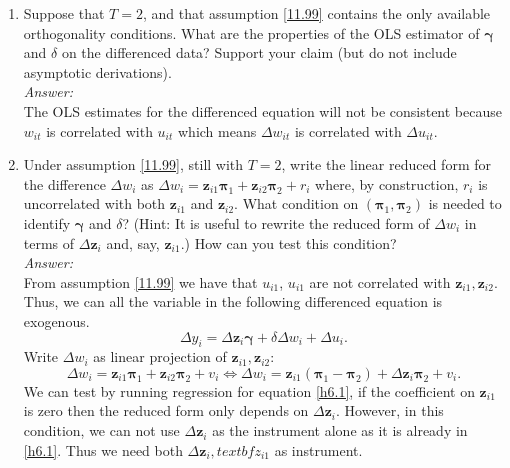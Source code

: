\documentclass[10pt]{article}
\begin{document}
\begin{enumerate}[label=\alph*.]
\item Suppose that $T=2$, and that assumption \eqref{11.99} contains the only available orthogonality conditions. What are the properties of the OLS estimator of $\pmb{\gamma}$ and $\delta$ on the differenced data? Support your claim (but do not include asymptotic derivations).
\\ \textit{Answer:}\\
The OLS estimates for the differenced equation will not be consistent because $w_{it}$ is correlated with $u_{it}$ which means $\Delta w_{it}$ is correlated with $\Delta u_{it}$.

\item Under assumption \eqref{11.99}, still with $T=2$, write the linear reduced form for the difference $\Delta w_i$ as $\Delta w_i=\textbf{z}_{i1}\pmb{\pi}_1+\textbf{z}_{i2}\pmb{\pi}_2+r_i$ where, by construction, $r_i$ is uncorrelated with both $\textbf{z}_{i1}$ and $\textbf{z}_{i2}$. What condition on $(\pmb{\pi}_1,\pmb{\pi}_2)$ is needed to identify $\pmb{\gamma}$ and $\delta$? (Hint: It is useful to rewrite the reduced form of $\Delta w_i$ in terms of $\Delta \textbf{z}_i$ and, say, $\textbf{z}_{i1}$.) How can you test this condition?
\\ \textit{Answer:}\\
From assumption \eqref{11.99} we have that $u_{i1}$, $u_{i1}$ are not correlated with $\textbf{z}_{i1},\textbf{z}_{i2}$. Thus, we can all the variable in the following differenced equation is exogenous.
\[\Delta y_i=\Delta \textbf{z}_i\pmb{\gamma}+\delta \Delta w_i+\Delta u_i.\]
Write $\Delta w_i$ as linear projection of $\textbf{z}_{i1}, \textbf{z}_{i2}$:
\[\Delta w_i=\textbf{z}_{i1}\pmb{\pi}_1+ \textbf{z}_{i2}\pmb{\pi}_2+v_i\Leftrightarrow \Delta w_i=\textbf{z}_{i1}(\pmb{\pi}_1-\pmb{\pi}_2)+ \Delta \textbf{z}_{i}\pmb{\pi}_2+v_i. \tag{1}\label{h6.1}\]
We can test by running regression for equation \eqref{h6.1}, if the coefficient on $\textbf{z}_{i1}$ is zero then the reduced form only depends on $\Delta \textbf{z}_{i}$. However, in this condition, we can not use $\Delta \textbf{z}_{i}$ as the instrument alone as it is already in  \eqref{h6.1}. Thus we need both $\Delta \textbf{z}_{i}, textbf{z}_{i1}$ as instrument.


\end{enumerate}
\end{document}

